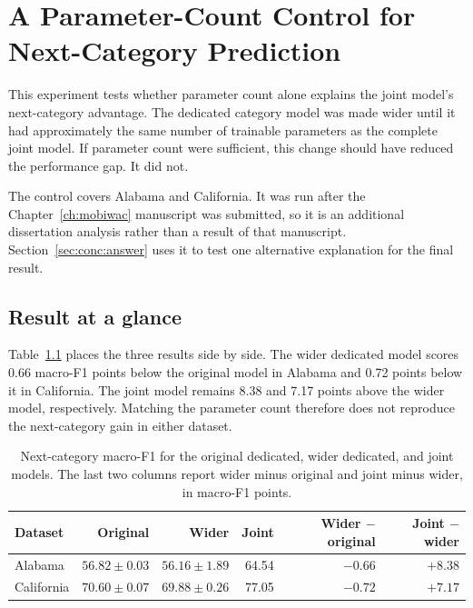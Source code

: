 \chapter{A Parameter-Count Control for Next-Category Prediction}
\label{apx:parameter-count-control}

This experiment tests whether parameter count alone explains the joint model's
next-category advantage. The dedicated category model was made wider until it had
approximately the same number of trainable parameters as the complete joint model.
If parameter count were sufficient, this change should have reduced the performance
gap. It did not.

The control covers Alabama and California. It was run after the
Chapter~\ref{ch:mobiwac} manuscript was submitted, so it is an additional
dissertation analysis rather than a result of that manuscript.
Section~\ref{sec:conc:answer} uses it to test one alternative explanation for the
final result.

\section{Result at a glance}
\label{sec:apx-parameter-summary}

Table~\ref{tab:apx-parameter-comparison} places the three results side by side. The
wider dedicated model scores 0.66 macro-F1 points below the original model in
Alabama and 0.72 points below it in California. The joint model remains 8.38 and
7.17 points above the wider model, respectively. Matching the parameter count
therefore does not reproduce the next-category gain in either dataset.

\begin{table}[H]
    \centering
    \caption{Next-category macro-F1 for the original dedicated, wider dedicated,
    and joint models. The last two columns report wider minus original and joint
    minus wider, in macro-F1 points.}
    \label{tab:apx-parameter-comparison}
    \begin{tabular}{lrrrrr}
        \toprule
        Dataset & Original & Wider & Joint & Wider $-$ original & Joint $-$ wider \\
        \midrule
        Alabama    & $56.82 \pm 0.03$ & $56.16 \pm 1.89$ & 64.54 & $-0.66$ & $+8.38$ \\
        California & $70.60 \pm 0.07$ & $69.88 \pm 0.26$ & 77.05 & $-0.72$ & $+7.17$ \\
        \bottomrule
    \end{tabular}
\end{table}

